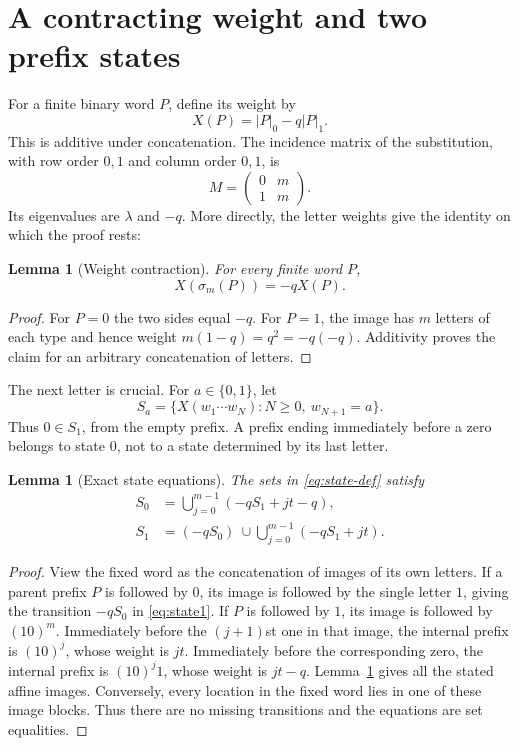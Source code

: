 \documentclass[11pt]{article}
\numberwithin{equation}{section}
\newtheorem{lemma}[theorem]{Lemma}
\theoremstyle{definition}
\theoremstyle{remark}
\begin{document}
\section{A contracting weight and two prefix states}\label{sec:weight}

For a finite binary word $P$, define its weight by
\begin{equation}\label{eq:weight}
X(P)=|P|_0-q|P|_1.
\end{equation}
This is additive under concatenation. The incidence matrix of the
substitution, with row order $0,1$ and column order $0,1$, is
\[
M=\begin{pmatrix}0&m\\1&m\end{pmatrix}.
\]
Its eigenvalues are $\lambda$ and $-q$. More directly, the letter weights
give the identity on which the proof rests:
\begin{lemma}[Weight contraction]\label{lem:contraction}
For every finite word $P$,
\begin{equation}\label{eq:weight-contract}
X(\sigma_m(P))=-qX(P).
\end{equation}
\end{lemma}
\begin{proof}
For $P=0$ the two sides equal $-q$. For $P=1$, the image has $m$ letters
of each type and hence weight $m(1-q)=q^2=-q(-q)$. Additivity proves the
claim for an arbitrary concatenation of letters.
\end{proof}

The next letter is crucial. For $a\in\{0,1\}$, let
\begin{equation}\label{eq:state-def}
S_a=\{X(w_1\cdots w_N):N\ge0,\ w_{N+1}=a\}.
\end{equation}
Thus $0\in S_1$, from the empty prefix. A prefix ending immediately
before a zero belongs to state $0$, not to a state determined by its last
letter.

\begin{lemma}[Exact state equations]\label{lem:state}
The sets in \eqref{eq:state-def} satisfy
\begin{align}
S_0&=\bigcup_{j=0}^{m-1}(-qS_1+jt-q),\label{eq:state0}\\
S_1&=(-qS_0)\ \cup\!
\bigcup_{j=0}^{m-1}(-qS_1+jt).\label{eq:state1}
\end{align}
\end{lemma}
\begin{proof}
View the fixed word as the concatenation of images of its own letters.
If a parent prefix $P$ is followed by $0$, its image is followed by the
single letter $1$, giving the transition $-qS_0$ in \eqref{eq:state1}.
If $P$ is followed by $1$, its image is followed by $(10)^m$.
Immediately before the $(j+1)$st one in that image, the internal prefix is
$(10)^j$, whose weight is $jt$. Immediately before the corresponding
zero, the internal prefix is $(10)^j1$, whose weight is $jt-q$.
Lemma~\ref{lem:contraction} gives all the stated affine images.
Conversely, every location in the fixed word lies in one of these image
blocks. Thus there are no missing transitions and the equations are
set equalities.
\end{proof}
\end{document}
